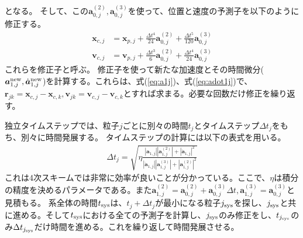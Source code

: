 \documentclass[a4paper,10pt,oneside,twocolumn,notitlepage,final]{jarticle}
\begin{document}
となる。
そして、この${\bm a}_{0,j}^{(2)},{\bm a}_{0,j}^{(3)}$を使って、位置と速度の予測子を以下のように修正する。
\begin{align}
{\bm x}_{c,j} &= {\bm x}_{p,j} + \frac{\Delta t ^4}{24} {\bm a}_{0,j}^{(2)} + \frac{\Delta t ^5}{120} {\bm a}_{0,j}^{(3)}\\
{\bm v}_{c,j} &= {\bm v}_{p,j} + \frac{\Delta t ^3}{6} {\bm a}_{0,j}^{(2)} + \frac{\Delta t ^4}{24} {\bm a}_{0,j}^{(3)}
\end{align}
これらを修正子と呼ぶ。
修正子を使って新たな加速度とその時間微分(${\bm a}_{1,j}^{\rm new},\dot{{\bm a}}_{1,j}^{\rm new}$)を計算する。これらは、式(\ref{eq:a1j})、式(\ref{eq:adot1j})で、${\bm r}_{jk} = {\bm x}_{c,j} - {\bm x}_{c,k},{\bm v}_{jk} = {\bm v}_{c,j} - {\bm v}_{c,k}$とすれば求まる。必要な回数だけ修正を繰り返す。

独立タイムステップでは、粒子$j$ごとに別々の時間$t_j$とタイムステップ$\Delta t_j$をもち、別々に時間発展する。
タイムステップの計算には以下の表式を用いる\citep{Aarseth1985}。
\begin{align}
\Delta t_j = \sqrt{\eta \frac{| {\bm a}_{1,j}| | {\bm a}_{1,j}^{(2)} | + | \dot{{\bm a}}_{1,j}| ^2}{| \dot{{\bm a}}_{1,j}| | {\bm a}_{1,j}^{(3)} | + | {\bm a}_{1,j}^{(2)} | ^2}}
\end{align}
これは4次スキームでは非常に効率が良いことが分かっている\citep{Makino1991}。ここで、$\eta$は積分の精度を決めるパラメータである。また${\bm a}_{1,j}^{(2)} = {\bm a}_{0,j}^{(2)} + {\bm a}_{0,j}^{(3)} \Delta t, {\bm a}_{1,j}^{(3)} = {\bm a}_{0,j}^{(3)}$と見積もる。
系全体の時間$t_{\rm sys}$は、$t_j + \Delta t_j$が最小になる粒子$j_{\rm sys}$を探し、$j_{\rm sys}$と共に進める。そして$t_{\rm sys}$における全ての予測子を計算し、$j_{\rm sys}$のみ修正をし、$t_{j_{\rm sys}}$のみ$\Delta t_{j_{\rm sys}}$だけ時間を進める。これを繰り返して時間発展させる。
\end{document}
